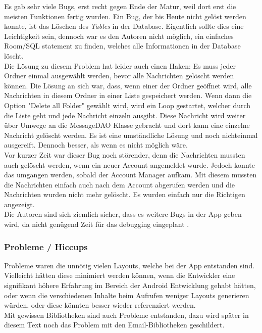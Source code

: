 \documentclass[a4paper,11pt]{article}
\begin{document}
Es gab sehr viele Bugs, erst recht gegen Ende der Matur, weil dort erst die meisten Funktionen fertig wurden. 
Ein Bug, der bis Heute nicht gelöst werden konnte, ist das Löschen des \textit{Tables} in der Database. Eigentlich sollte dies eine
Leichtigkeit sein, dennoch war es den Autoren nicht möglich, ein einfaches Room/SQL statement zu finden, welches alle Informationen in der Database löscht. \\

Die Lösung zu diesem Problem hat leider auch einen Haken: Es muss jeder Ordner einmal ausgewählt werden, bevor alle Nachrichten gelöscht werden können. 
Die Lösung an sich war, dass, wenn einer der Ordner geöffnet wird, alle Nachrichten in diesem Ordner in einer Liste gespeichert werden. Wenn dann die Option "Delete all Folder"
gewählt wird, wird ein Loop gestartet, welcher durch die Liste geht und jede Nachricht einzeln ausgibt. Diese Nachricht wird weiter über Umwege an die MessageDAO Klasse gebracht
und dort kann eine einzelne Nachricht gelöscht werden. Es ist eine umständliche Lösung und noch nichteinmal ausgereift. Dennoch besser, als wenn es nicht möglich wäre. \\

Vor kurzer Zeit war dieser Bug noch störender, denn die Nachrichten mussten auch gelöscht werden, wenn ein neuer Account angemeldet wurde. Jedoch 
konnte das umgangen werden, sobald der Account Manager aufkam. Mit diesem mussten die Nachrichten einfach auch nach dem Account abgerufen werden und die Nachrichten
wurden nicht mehr gelöscht. Es wurden einfach nur die Richtigen angezeigt. \\

Die Autoren sind sich ziemlich sicher, dass es weitere Bugs in der App geben wird, da nicht genügend Zeit für das debugging eingeplant . 


\subsubsection{Probleme / Hiccups}
Probleme waren die unnötig vielen Layouts, welche bei der App entstanden sind. Vielleicht hätten diese minimiert werden können, wenn die Entwickler eine signifikant höhere Erfahrung im Bereich der Android Entwicklung gehabt hätten, oder wenn die verschiedenen Inhalte beim Aufrufen weniger Layouts generieren würden, oder diese könnten besser wieder referenziert werden.\\

Mit gewissen Bibliotheken sind auch Probleme entstanden, dazu wird später in diesem Text noch das Problem mit den Email-Bibliotheken geschildert.
\end{document}
